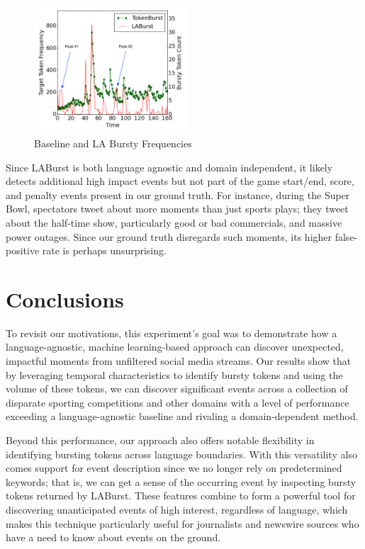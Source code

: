 \documentclass[letterpaper]{article}
\begin{document}
\begin{figure}[hbtp]
\begin{center}
\includegraphics[width=2.25in]{./figures/wc0713freq-labeled.png}
\caption{Baseline and LA Bursty Frequencies}
\label{fig:worldCupFreqs}
\end{center}
\end{figure}

Since LABurst is both language agnostic and domain independent, it likely detects additional high impact events but not part of the game start/end, score, and penalty events present in our ground truth.
For instance, during the Super Bowl, spectators tweet about more moments than just sports plays; they tweet about the half-time show, particularly good or bad commercials, and massive power outages.
Since our ground truth disregards such moments, its higher false-positive rate is perhaps unsurprising.

\section{Conclusions}
\label{sect:conlusions}

To revisit our motivations, this experiment's goal was to demonstrate how a language-agnostic, machine learning-based approach can discover unexpected, impactful moments from unfiltered social media streams.
Our results show that by leveraging temporal characteristics to identify bursty tokens and using the volume of these tokens, we can discover significant events across a collection of disparate sporting competitions and other domains with a level of performance exceeding a language-agnostic baseline and rivaling a domain-dependent method.

Beyond this performance, our approach also offers notable flexibility in identifying bursting tokens  across language boundaries.
With this versatility also comes support for event description since we no longer rely on predetermined keywords; that is, we can get a sense of the occurring event by inspecting bursty tokens returned by LABurst.
These features combine to form a powerful tool for discovering unanticipated events of high interest, regardless of language, which makes this technique particularly useful for journalists and newswire sources who have a need to know about events on the ground.
\end{document}
